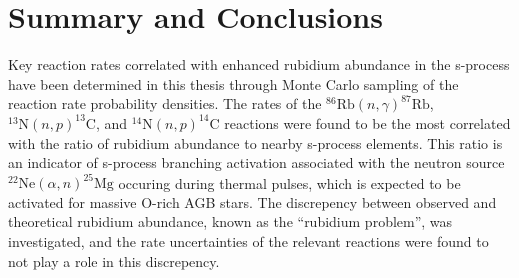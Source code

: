 \chapter{Summary and Conclusions}
\label{chap:conc}




Key reaction rates correlated with enhanced rubidium abundance in the s-process have been determined in this thesis through Monte Carlo sampling of the reaction rate probability densities. The rates of the $^{86}\mathrm{Rb}(n,\gamma)^{87}\mathrm{Rb}$, $^{13}\mathrm{N}(n,p)^{13}\mathrm{C}$, and $^{14}\mathrm{N}(n,p)^{14}\mathrm{C}$ reactions were found to be the most correlated with the ratio of rubidium abundance to nearby s-process elements. This ratio is an indicator of s-process branching activation associated with the neutron source $^{22}\mathrm{Ne}(\alpha,n)^{25}\mathrm{Mg}$ occuring during thermal pulses, which is expected to be activated for massive O-rich AGB stars. The discrepency between observed and theoretical rubidium abundance, known as the ``rubidium problem'', was investigated, and the rate uncertainties of the relevant reactions were found to not play a role in this discrepency.

